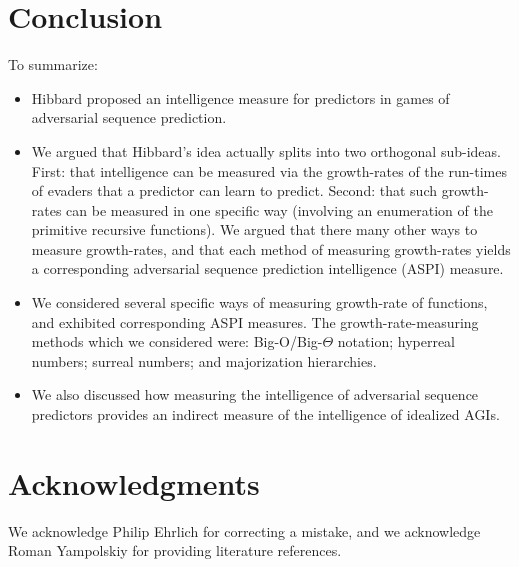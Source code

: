 \documentclass{article}
\begin{document}
\section{Conclusion}
\label{conclusionsection}

To summarize:
\begin{itemize}
    \item
    Hibbard proposed \cite{hibbard} an intelligence measure for predictors
    in games of adversarial sequence prediction.
    \item
    We argued that Hibbard's idea actually splits into two orthogonal sub-ideas.
    First: that intelligence can be measured via the growth-rates of the run-times
    of evaders that a predictor can learn to predict. Second: that such growth-rates can
    be measured in one specific way (involving an enumeration of the primitive recursive
    functions). We argued that there many other ways to measure growth-rates,
    and that each method of measuring growth-rates yields a corresponding
    adversarial sequence prediction intelligence (ASPI) measure.
    \item
    We considered several specific ways of measuring growth-rate of functions, and exhibited
    corresponding ASPI measures. The growth-rate-measuring methods
    which we considered were: Big-O/Big-$\Theta$ notation; hyperreal numbers;
    surreal numbers; and majorization hierarchies.
    \item
    We also discussed how measuring the intelligence of adversarial sequence predictors
    provides an indirect measure of the intelligence of idealized AGIs.
\end{itemize}

\section*{Acknowledgments}

We acknowledge Philip Ehrlich for correcting a mistake, and we
acknowledge Roman Yampolskiy for providing literature references.



\end{document}
